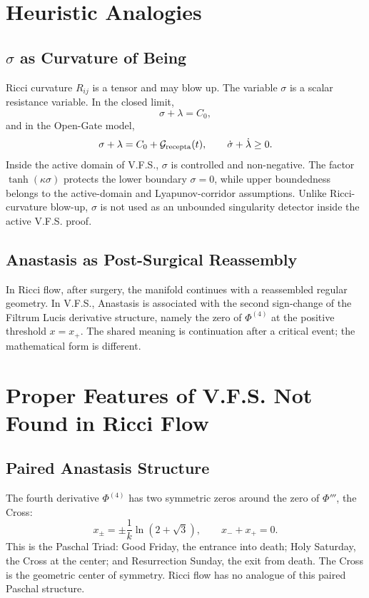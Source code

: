 \documentclass[11pt]{article}
\newcommand{\VFS}{V.F.S.}
\newcommand{\Grec}{\mathcal{G}_{\rm recepta}}
\begin{document}
\section{Heuristic Analogies}

\subsection{$\sigma$ as Curvature of Being}

Ricci curvature $R_{ij}$ is a tensor and may blow up. The variable $\sigma$ is a scalar resistance variable. In the closed limit,
\begin{equation}
\sigma+\lambda=C_0,
\end{equation}
and in the Open-Gate model,
\begin{equation}
\sigma+\lambda=C_0+\Grec(t),
\qquad
\dot\sigma+\dot\lambda\ge0.
\end{equation}
Inside the active domain of \VFS{}, $\sigma$ is controlled and non-negative. The factor $\tanh(\kappa\sigma)$ protects the lower boundary $\sigma=0$, while upper boundedness belongs to the active-domain and Lyapunov-corridor assumptions. Unlike Ricci-curvature blow-up, $\sigma$ is not used as an unbounded singularity detector inside the active \VFS{} proof.

\subsection{Anastasis as Post-Surgical Reassembly}

In Ricci flow, after surgery, the manifold continues with a reassembled regular geometry. In \VFS{}, Anastasis is associated with the second sign-change of the Filtrum Lucis derivative structure, namely the zero of $\Phi^{(4)}$ at the positive threshold $x=x_+$. The shared meaning is continuation after a critical event; the mathematical form is different.

\section{Proper Features of V.F.S. Not Found in Ricci Flow}

\subsection{Paired Anastasis Structure}

The fourth derivative $\Phi^{(4)}$ has two symmetric zeros around the zero of $\Phi'''$, the Cross:
\begin{equation}
x_{\pm}=\pm\frac{1}{k}\ln(2+\sqrt3),
\qquad
x_-+x_+=0.
\end{equation}
This is the Paschal Triad: Good Friday, the entrance into death; Holy Saturday, the Cross at the center; and Resurrection Sunday, the exit from death. The Cross is the geometric center of symmetry. Ricci flow has no analogue of this paired Paschal structure.
\end{document}
